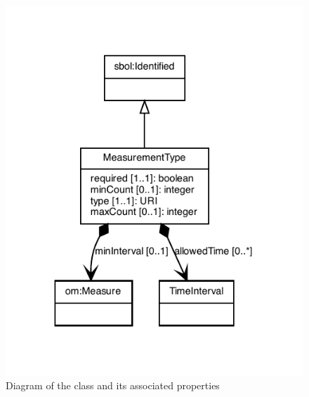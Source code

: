\begin{figure}[ht]
\begin{center}
\includegraphics[scale=0.8]{figures/MeasurementType}
\caption[]{Diagram of the  class and its associated properties}
\label{uml:MeasurementType}
\end{center}
\end{figure}


